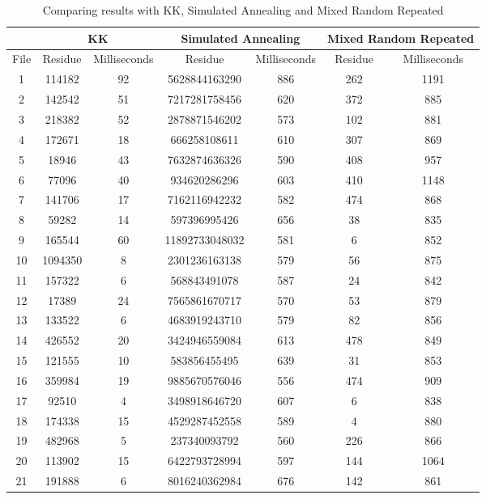 \documentclass[tikz, 12pt]{scrartcl}
\begin{document}
\begin{longtable}{|c|cc|cc|cc|}
\caption{Comparing results with KK,  Simulated Annealing and Mixed Random Repeated\label{kkSimulatedAndMixedRandom}}\\
\hline
 	 & \multicolumn{2}{c}{ KK} 	 & \multicolumn{2}{c}{ Simulated Annealing} 	 & \multicolumn{2}{c|}{ Mixed Random Repeated} \\
\hline
File	 & Residue 	 & 	 Milliseconds	 & Residue 	 & 	 Milliseconds	 & Residue 	 & 	 Milliseconds\\
\hline
1	 &114182	 & 	92	 &5628844163290	 & 	886	 &262	 & 	1191\\
2	 &142542	 & 	51	 &7217281758456	 & 	620	 &372	 & 	885\\
3	 &218382	 & 	52	 &2878871546202	 & 	573	 &102	 & 	881\\
4	 &172671	 & 	18	 &666258108611	 & 	610	 &307	 & 	869\\
5	 &18946	 & 	43	 &7632874636326	 & 	590	 &408	 & 	957\\
6	 &77096	 & 	40	 &934620286296	 & 	603	 &410	 & 	1148\\
7	 &141706	 & 	17	 &7162116942232	 & 	582	 &474	 & 	868\\
8	 &59282	 & 	14	 &597396995426	 & 	656	 &38	 & 	835\\
9	 &165544	 & 	60	 &11892733048032	 & 	581	 &6	 & 	852\\
10	 &1094350	 & 	8	 &2301236163138	 & 	579	 &56	 & 	875\\
11	 &157322	 & 	6	 &568843491078	 & 	587	 &24	 & 	842\\
12	 &17389	 & 	24	 &7565861670717	 & 	570	 &53	 & 	879\\
13	 &133522	 & 	6	 &4683919243710	 & 	579	 &82	 & 	856\\
14	 &426552	 & 	20	 &3424946559084	 & 	613	 &478	 & 	849\\
15	 &121555	 & 	10	 &583856455495	 & 	639	 &31	 & 	853\\
16	 &359984	 & 	19	 &9885670576046	 & 	556	 &474	 & 	909\\
17	 &92510	 & 	4	 &3498918646720	 & 	607	 &6	 & 	838\\
18	 &174338	 & 	15	 &4529287452558	 & 	589	 &4	 & 	880\\
19	 &482968	 & 	5	 &237340093792	 & 	560	 &226	 & 	866\\
20	 &113902	 & 	15	 &6422793728994	 & 	597	 &144	 & 	1064\\
21	 &191888	 & 	6	 &8016240362984	 & 	676	 &142	 & 	861\\

\end{longtable}
\end{document}
